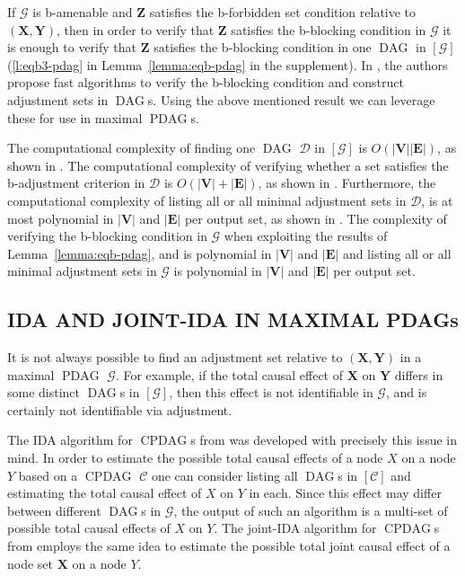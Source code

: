 \documentclass[letterpaper]{article}
\theoremstyle{definition}
\theoremstyle{remark}
\DeclareMathOperator{\PDAG}{PDAG}
\DeclareMathOperator{\CPDAG}{CPDAG}
\DeclareMathOperator{\DAG}{DAG}
\newcommand{\bforb}{the b-forbidden set condition}
\newcommand{\bblck}{the b-blocking condition}
\newcommand{\mpdag}{maximal $\PDAG$}
\newcommand{\MPDAG}{MAXIMAL PDAG}
\newcommand{\g}[1][G]{\mathcal{#1}}
\begin{document}
If $\g$ is b-amenable and $\mathbf{Z}$ satisfies \bforb{} relative to $(\mathbf{X,Y})$, then in order to verify that $\mathbf{Z}$ satisfies \bblck{} in $\g$ it is enough to verify that $\mathbf{Z}$ satisfies \bblck{} in one $\DAG$ in $[\g]$ (\ref{l:eqb3-pdag} in Lemma~\ref{lemma:eqb-pdag} in the supplement).
In \cite{vanconstructing}, the authors propose fast algorithms to verify \bblck{} and construct adjustment sets in $\DAG$s. Using the above mentioned result we can leverage these for use in \mpdag{}s.

The computational complexity of finding one $\DAG$ $\g[D]$ in $[\g]$ is $O(|\mathbf{V}||\mathbf{E}|)$, as shown in \cite{dorTarsi92}. The computational complexity of verifying whether a set satisfies the b-adjustment criterion in $\g[D]$  is $O(|\mathbf{V}| +|\mathbf{E}|)$, as shown in \cite{vanconstructing}. Furthermore, the computational complexity of listing all or all minimal adjustment sets in $\g[D]$, is at most polynomial in $|\mathbf{V}|$ and $|\mathbf{E}|$ per output set, as shown in \cite{vanconstructing}. The complexity of verifying \bblck{} in $\g$ when exploiting the results of Lemma~\ref{lemma:eqb-pdag}, \cite{dorTarsi92} and \cite{vanconstructing} is polynomial in $|\mathbf{V}|$ and $|\mathbf{E}|$ and listing all or all minimal adjustment sets in $\g$ is polynomial in $|\mathbf{V}|$ and $|\mathbf{E}|$ per output set.


\subsection{IDA AND JOINT-IDA IN \MPDAG{}s} \label{sec:ida}

It is not always possible to find an adjustment set relative to $(\mathbf{X,Y})$ in a \mpdag{} $\g$. For example, if the total causal effect of $\mathbf{X}$ on $\mathbf{Y}$ differs in some distinct $\DAG$s in $[\g]$, then this effect is not identifiable in $\g$, and is certainly not identifiable via adjustment.

The IDA algorithm for $\CPDAG$s from \cite{MaathuisKalischBuehlmann09} was developed with precisely this issue in mind.
In order to estimate the possible total causal effects of a node $X$ on a node $Y$ based on a $\CPDAG$ $\g[C]$ one can consider listing all $\DAG$s in $[\g[C]]$ and estimating the total causal effect of $X$ on $Y$ in each. Since this effect may differ between different $\DAG$s in $\g$, the output of such an algorithm is a multi-set of possible total causal effects of $X$ on $Y$.
The joint-IDA algorithm for $\CPDAG$s from \cite{nandy2014estimating} employs the same idea to estimate the possible total joint causal effect of a node set $\mathbf{X}$ on a node $Y$.
\end{document}
